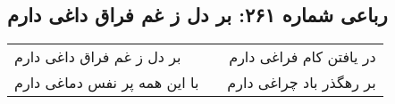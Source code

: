 \begin{center}
\section*{رباعی شماره ۲۶۱: بر دل ز غم فراق داغی دارم}
\label{sec:sh261}
\begin{longtable}{l p{0.5cm} r}
بر دل ز غم فراق داغی دارم
&&
در یافتن کام فراغی دارم
\\
با این همه پر نفس دماغی دارم
&&
بر رهگذر باد چراغی دارم
\\
\end{longtable}
\end{center}
